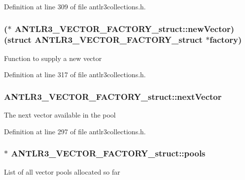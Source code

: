 Definition at line 309 of file antlr3collections.\-h.

\hypertarget{struct_a_n_t_l_r3___v_e_c_t_o_r___f_a_c_t_o_r_y__struct_a6b8a6731dfee30248de74188f6d6acb1}{
\subsubsection[{new\-Vector}]{($\ast$ A\-N\-T\-L\-R3\-\_\-\-V\-E\-C\-T\-O\-R\-\_\-\-F\-A\-C\-T\-O\-R\-Y\-\_\-struct\-::new\-Vector)(struct {\bf A\-N\-T\-L\-R3\-\_\-\-V\-E\-C\-T\-O\-R\-\_\-\-F\-A\-C\-T\-O\-R\-Y\-\_\-struct} $\ast$factory)}}\label{struct_a_n_t_l_r3___v_e_c_t_o_r___f_a_c_t_o_r_y__struct_a6b8a6731dfee30248de74188f6d6acb1}
Function to supply a new vector 

Definition at line 317 of file antlr3collections.\-h.

\hypertarget{struct_a_n_t_l_r3___v_e_c_t_o_r___f_a_c_t_o_r_y__struct_ab02f4d8c74c123a9d4f100285f395dfb}{
\subsubsection[{next\-Vector}]{ A\-N\-T\-L\-R3\-\_\-\-V\-E\-C\-T\-O\-R\-\_\-\-F\-A\-C\-T\-O\-R\-Y\-\_\-struct\-::next\-Vector}}\label{struct_a_n_t_l_r3___v_e_c_t_o_r___f_a_c_t_o_r_y__struct_ab02f4d8c74c123a9d4f100285f395dfb}
The next vector available in the pool 

Definition at line 297 of file antlr3collections.\-h.

\hypertarget{struct_a_n_t_l_r3___v_e_c_t_o_r___f_a_c_t_o_r_y__struct_a5511d423918dd58129f1ed61e613810f}{
\subsubsection[{pools}]{$\ast$ A\-N\-T\-L\-R3\-\_\-\-V\-E\-C\-T\-O\-R\-\_\-\-F\-A\-C\-T\-O\-R\-Y\-\_\-struct\-::pools}}\label{struct_a_n_t_l_r3___v_e_c_t_o_r___f_a_c_t_o_r_y__struct_a5511d423918dd58129f1ed61e613810f}
List of all vector pools allocated so far 

